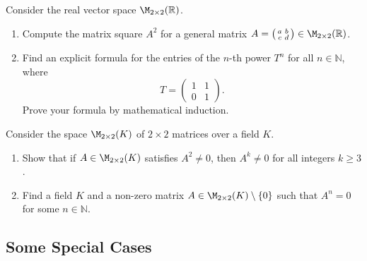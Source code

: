 \begin{exercise}
\label{exc:matrix_powers_2x2}
Consider the real vector space $\M_{2 \times 2}(\mathbb{R})$.
\begin{enumerate}
    \item Compute the matrix square $A^2$ for a general matrix $A = \left(\begin{smallmatrix} a & b \\ c & d \end{smallmatrix}\right) \in \M_{2 \times 2}(\mathbb{R})$.
    \item Find an explicit formula for the entries of the $n$-th power $T^n$ for all $n \in \mathbb{N}$, where
    \[
    T = \begin{pmatrix} 1 & 1 \\ 0 & 1 \end{pmatrix}.
    \]
    Prove your formula by mathematical induction.
\end{enumerate}
\end{exercise}

\begin{exercise}
\label{exc:powers_2x2_nilpotency}
Consider the space $\M_{2 \times 2}(K)$ of $2 \times 2$ matrices over a field $K$.
\begin{enumerate}
    \item Show that if $A \in \M_{2 \times 2}(K)$ satisfies $A^2 \ne 0$, then $A^k \ne 0$ for all integers $k \ge 3$.
    \item Find a field $K$ and a non-zero matrix $A \in \M_{2 \times 2}(K) \setminus \{0\}$ such that $A^n = 0$ for some $n \in \mathbb{N}$.
\end{enumerate}
\end{exercise}

\subsection{Some Special Cases}

